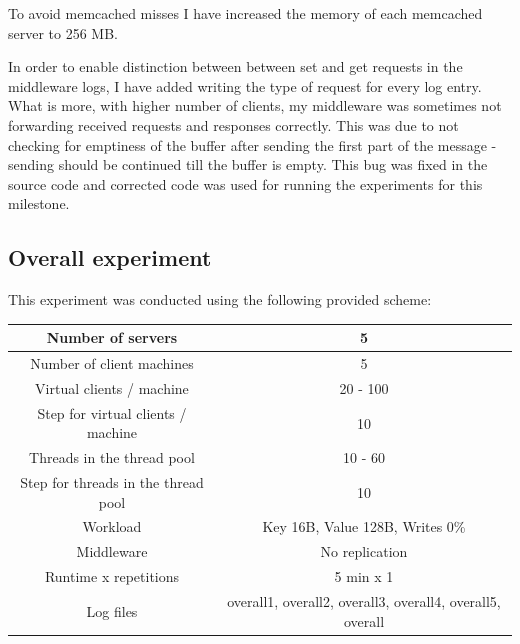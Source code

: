 \documentclass[11pt]{article}
\begin{document}
To avoid memcached misses I have increased the memory of each memcached server to 256 MB.

In order to enable distinction between between set and get requests in the middleware logs, I have added writing the type of request for every log entry. What is more, with higher number of clients, my middleware was sometimes not forwarding received requests and responses correctly. This was due to not checking for emptiness of the buffer after sending the first part of the message - sending should be continued till the buffer is empty. This bug was fixed in the source code and corrected code was used for running the experiments for this milestone. 

\subsection{Overall experiment}
This experiment was conducted using the following provided scheme:
\medskip

\small{
\smallskip
\begin{tabular}{|c|c|}
\hline Number of servers & 5 \\ 
\hline Number of client machines & 5 \\ 
\hline Virtual clients / machine & 20 - 100 \\ 
\hline Step for virtual clients / machine & 10 \\ 
\hline Threads in the thread pool & 10 - 60 \\
\hline Step for threads in the thread pool & 10 \\
\hline Workload & Key 16B, Value 128B, Writes 0\% \\
\hline Middleware & No replication \\ 
\hline Runtime x repetitions & 5 min x 1 \\ 

\hline Log files & overall1, overall2, overall3, overall4, overall5, overall \\
\hline 
\end{tabular} }
\medskip
\end{document}
